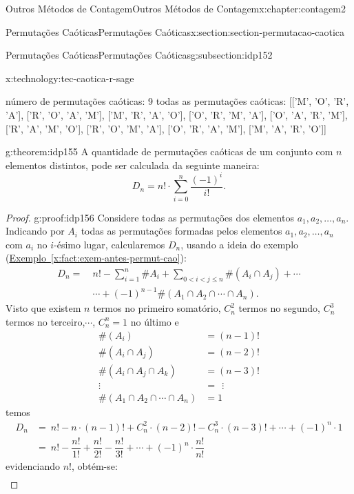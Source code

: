 \documentclass[oneside,10pt,]{book}
\newcommand{\xreffont}{\relax}
\numberwithin{equation}{section}
\newcommand{\lt}{<}
\newcommand{\amp}{&}
\begin{document}
\begin{chapterptx}{Outros Métodos de Contagem}{}{Outros Métodos de Contagem}{}{}{x:chapter:contagem2}
\begin{sectionptx}{Permutações Caóticas}{}{Permutações Caóticas}{}{}{x:section:section-permutacao-caotica}
\begin{subsectionptx}{Permutações Caóticas}{}{Permutações Caóticas}{}{}{g:subsection:idp152}
\begin{technology}{}{x:technology:tec-caotica-r-sage}
\begin{sageoutput}
número de permutações caóticas: 9
todas as permutações caóticas:
[['M', 'O', 'R', 'A'],
 ['R', 'O', 'A', 'M'],
 ['M', 'R', 'A', 'O'],
 ['O', 'R', 'M', 'A'],
 ['O', 'A', 'R', 'M'],
 ['R', 'A', 'M', 'O'],
 ['R', 'O', 'M', 'A'],
 ['O', 'R', 'A', 'M'],
 ['M', 'A', 'R', 'O']]
\end{sageoutput}
\end{technology}
\begin{theorem}{}{}{g:theorem:idp155}%
A quantidade de permutações caóticas de um conjunto com \(n\) elementos distintos, pode ser calculada da seguinte maneira:%
\begin{equation*}
D_n=n!\cdot\sum_{i=0}^{n}\dfrac{(-1)^i}{i!}.
\end{equation*}
%
\end{theorem}
\begin{proof}{}{g:proof:idp156}
Considere todas as permutações dos elementos \(a_1 , a_2 , \ldots , a_n\). Indicando por \(A_i\) todas as permutações formadas pelos elementos \(a_1 , a_2 , \ldots , a_n\) com \(a_i\) no \(i\)-ésimo lugar, calcularemos \(D_n\), usando a ideia do exemplo (\hyperref[x:fact:exem-antes-permut-cao]{Exemplo~{\xreffont\ref{x:fact:exem-antes-permut-cao}}}):%
\begin{align*}
D_n = \amp ~  n! - \sum_{i=1}^{n}\#A_i + \sum_{0\lt i\lt j\leq n}\#(A_i\cap A_j)+\cdots \\
\amp ~  \cdots  +(-1)^{n-1}\#(A_1\cap A_2\cap \cdots\cap A_n). 
\end{align*}
Visto que existem \(n\) termos no primeiro somatório, \(C_n^2\) termos no segundo, \(C_n^3\) termos no terceiro,\(\cdots\), \(C_n^n=1\) no último e%
\begin{align*}
\#(A_i) \amp =  (n-1)! \\
\#(A_i\cap A_j) \amp =  (n-2)! \\
\#(A_i\cap A_j\cap A_k) \amp =  (n-3)! \\
\vdots ~~~~~ \amp = ~~ \vdots \\
\#(A_1\cap A_2\cap\cdots\cap A_n) \amp =  1 
\end{align*}
temos%
\begin{align*}
D_n \amp = ~ n!-n\cdot(n-1)!+C_n^2\cdot(n-2)!-C_n^3\cdot(n-3)!+\cdots +(-1)^n\cdot 1 \\
\amp = ~ n!-\dfrac{n!}{1!}+\dfrac{n!}{2!}-\dfrac{n!}{3!}+\cdots
+(-1)^n\cdot \dfrac{n!}{n!} 
\end{align*}
evidenciando \(n!\), obtém-se:%
\begin{align*}

\end{align*}
\end{proof}
\end{subsectionptx}
\end{sectionptx}
\end{chapterptx}
\end{document}
